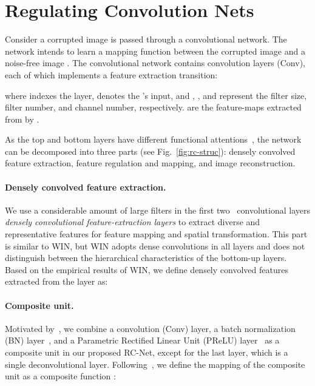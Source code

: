 \documentclass[10pt,twocolumn,letterpaper]{article}
\begin{document}
\section{Regulating Convolution Nets} \label{sec:method}
Consider a corrupted image  is passed through a convolutional network. The network intends to learn a mapping function  between the corrupted image  and a noise-free image . The convolutional network contains  convolution layers (Conv), each of which implements a feature extraction transition:

where  indexes the layer,  denotes the 's input, and , , and  represent the filter size, filter number, and channel number, respectively.  are the feature-maps extracted from  by .  

As the top and bottom layers have different functional attentions~\cite{zeiler2014visualizing}, the network can be decomposed into three parts (see Fig.~\ref{fig:rc-struc}): densely convolved feature extraction, feature regulation and mapping, and image reconstruction.  

\paragraph{Densely convolved feature extraction.}We use a considerable amount of large filters in the first two~\cite{zeiler2014visualizing} convolutional layers \textit{densely convolutional feature-extraction layers} to extract diverse and representative features for feature mapping and spatial transformation. This part is similar to WIN, but WIN adopts dense convolutions in all layers and does not distinguish between the hierarchical characteristics of the bottom-up layers. Based on the empirical results of WIN, we define densely convolved features extracted from the  layer as:



\paragraph{Composite unit.}Motivated by~\cite{he2016deep,zhang2016beyond,dong2016accelerating}, we combine a convolution (Conv) layer, a batch normalization (BN) layer~\cite{ioffe2015batch}, and a Parametric Rectified Linear Unit (PReLU) layer~\cite{He_2015_ICCV} as a composite unit in our proposed RC-Net, except for the last layer, which is a single deconvolutional layer. Following~\cite{huang2016densely}, we define the mapping of the composite unit as a composite function :
\end{document}
